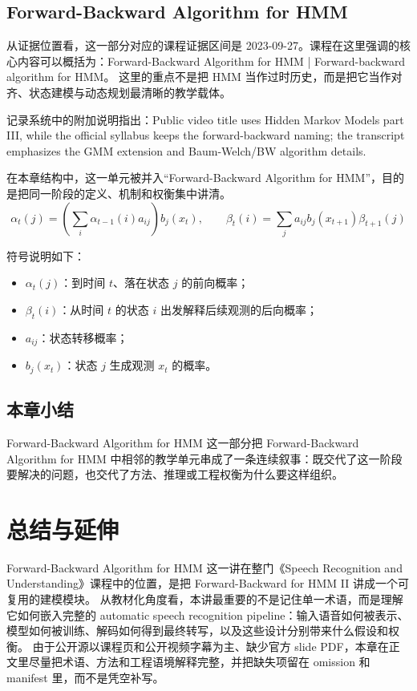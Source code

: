 \documentclass[a4paper]{article}
\begin{document}
\subsection{Forward-Backward Algorithm for HMM}
从证据位置看，这一部分对应的课程证据区间是 2023-09-27。课程在这里强调的核心内容可以概括为：Forward-Backward Algorithm for HMM | Forward-backward algorithm for HMM。
这里的重点不是把 HMM 当作过时历史，而是把它当作对齐、状态建模与动态规划最清晰的教学载体。

记录系统中的附加说明指出：Public video title uses Hidden Markov Models part III, while the official syllabus keeps the forward-backward naming; the transcript emphasizes the GMM extension and Baum-Welch/BW algorithm details.

在本章结构中，这一单元被并入“Forward-Backward Algorithm for HMM”，目的是把同一阶段的定义、机制和权衡集中讲清。
\[
\alpha_t(j) = \left( \sum_i \alpha_{t-1}(i) a_{ij} \right) b_j(x_t), \qquad
\beta_t(i) = \sum_j a_{ij} b_j(x_{t+1}) \beta_{t+1}(j)
\]

符号说明如下：
\begin{itemize}
\item $\alpha_t(j)$：到时间 $t$、落在状态 $j$ 的前向概率；
\item $\beta_t(i)$：从时间 $t$ 的状态 $i$ 出发解释后续观测的后向概率；
\item $a_{ij}$：状态转移概率；
\item $b_j(x_t)$：状态 $j$ 生成观测 $x_t$ 的概率。
\end{itemize}

\subsection{本章小结}
Forward-Backward Algorithm for HMM 这一部分把 Forward-Backward Algorithm for HMM 中相邻的教学单元串成了一条连续叙事：既交代了这一阶段要解决的问题，也交代了方法、推理或工程权衡为什么要这样组织。

\section{总结与延伸}
Forward-Backward Algorithm for HMM 这一讲在整门《Speech Recognition and Understanding》课程中的位置，是把 Forward-Backward for HMM II 讲成一个可复用的建模模块。
从教材化角度看，本讲最重要的不是记住单一术语，而是理解它如何嵌入完整的 automatic speech recognition pipeline：输入语音如何被表示、模型如何被训练、解码如何得到最终转写，以及这些设计分别带来什么假设和权衡。
由于公开源以课程页和公开视频字幕为主、缺少官方 slide PDF，本章在正文里尽量把术语、方法和工程语境解释完整，并把缺失项留在 omission 和 manifest 里，而不是凭空补写。
\end{document}
